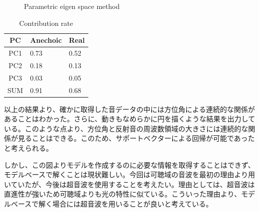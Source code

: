 \begin{figure}[ht]
    \centering
    \label{fig:pes_check_anechoic}
    \label{fig:pes_check_real}
    \caption{Parametric eigen space method}
    \label{fig:pes_check}
\end{figure}

\begin{table}[ht]
    \centering
    \caption{Contribution rate}
    \vspace{1zh}
    \begin{tabular}{|c||p{4em}|p{4em}|} \hline
        PC & Anechoic & Real \\ \hline\hline
        PC1 & 0.73 & 0.52 \\ \hline
        PC2 & 0.18 & 0.13 \\ \hline
        PC3 & 0.03 & 0.05 \\ \hline
        SUM & 0.91 & 0.68 \\ \hline
    \end{tabular}
    \label{tab:pes_contri}
\end{table}

\clearpage

以上の結果より、確かに取得した音データの中には方位角による連続的な関係があることはわかった。さらに、動きもなめらかに円を描くような結果を出力している。このような点より、方位角と反射音の周波数領域の大きさには連続的な関係が見ることはできる。このため、サポートベクターによる回帰が可能であったと考えられる。

しかし、この図よりモデルを作成するのに必要な情報を取得することはできず、モデルベースで解くことは現状難しい。今回は可聴域の音波を最初の理由より用いていたが、今後は超音波を使用することを考えたい。理由としては、超音波は直進性が強いため可聴域よりも光の特性に似ている。こういった理由より、モデルベースで解く場合には超音波を用いることが良いと考えている。

\clearpage
\newpage
